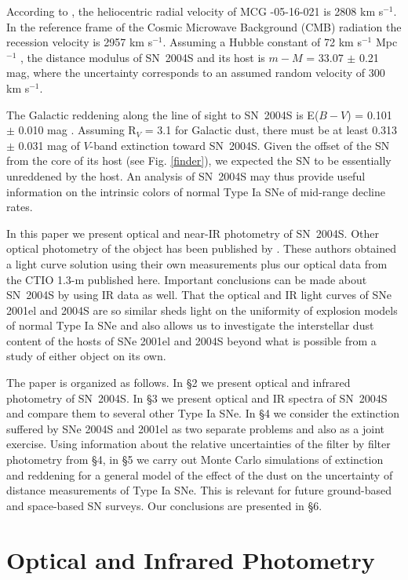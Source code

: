 \documentclass[12pt,preprint,psfig,epsf]{aastex}
\begin{document}
According to \citet{The_etal05}, the heliocentric radial velocity of
MCG -05-16-021 is 2808 km s$^{-1}$. In the reference frame of the Cosmic
Microwave Background (CMB) radiation the recession velocity is 2957 km
s$^{-1}$.  Assuming a Hubble constant of 72 km s$^{-1}$ Mpc$^{-1}$
\citep{Fre_etal01}, the distance modulus of SN~2004S and its host is $m-M$ =
33.07 $\pm$ 0.21 mag, where the uncertainty corresponds to an assumed random
velocity of 300 km s$^{-1}$.

The Galactic reddening along the line of sight to SN~2004S is E($B-V$) =
0.101 $\pm$ 0.010 mag \citep{Sch_etal98}. Assuming R$_V$ = 3.1 for Galactic dust, 
there must be at least 0.313 $\pm$ 0.031 mag of $V$-band extinction toward 
SN~2004S.  Given the offset of the SN from the core of
its host (see Fig. \ref{finder}), we expected the SN to be essentially 
unreddened by the host.  An
analysis of SN~2004S may thus provide useful information on the
intrinsic colors of normal Type Ia SNe of mid-range decline rates.

In this paper we present optical and near-IR photometry of SN~2004S. Other
optical photometry of the object has been published by \citet{Mis_etal05}.  
These authors obtained a light curve solution using their own measurements
plus our optical data from the CTIO 1.3-m published here.  Important conclusions 
can be made about SN~2004S by using IR data as well.  That the optical and IR light
curves of SNe 2001el and 2004S are so similar sheds light on the uniformity
of explosion models of normal Type Ia SNe and also allows us to investigate
the interstellar dust content of the hosts of SNe 2001el and 2004S beyond
what is possible from a study of either object on its own.

The paper is organized as follows.  In \S2 we present optical and infrared
photometry of SN~2004S.  In \S3 we present optical and IR spectra of SN~2004S
and compare them to several other Type Ia SNe.  In \S4 we consider the
extinction suffered by SNe 2004S and 2001el as two separate problems
and also as a joint exercise.  Using information about the relative
uncertainties of the filter by filter photometry from \S4, in \S5 we 
carry out Monte Carlo simulations of extinction and reddening for a
general model of the effect of the dust on the uncertainty of distance
measurements of Type Ia SNe.  This is relevant for future ground-based
and space-based SN surveys.  Our conclusions are presented in \S6.


\section{Optical and Infrared Photometry}
\end{document}

